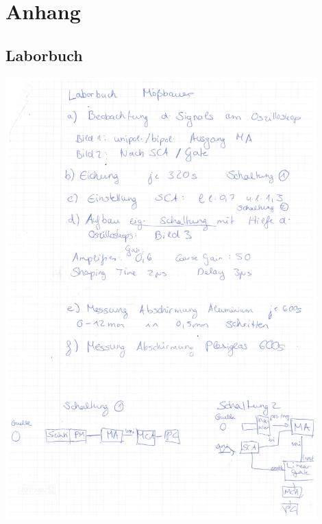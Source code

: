 \section{Anhang}

\subsection{Laborbuch}
\begin{minipage}{\textwidth}
	\centering
	\includegraphics[width=0.9\textwidth]{../figures/laborbuch1.pdf}
\end{minipage}

